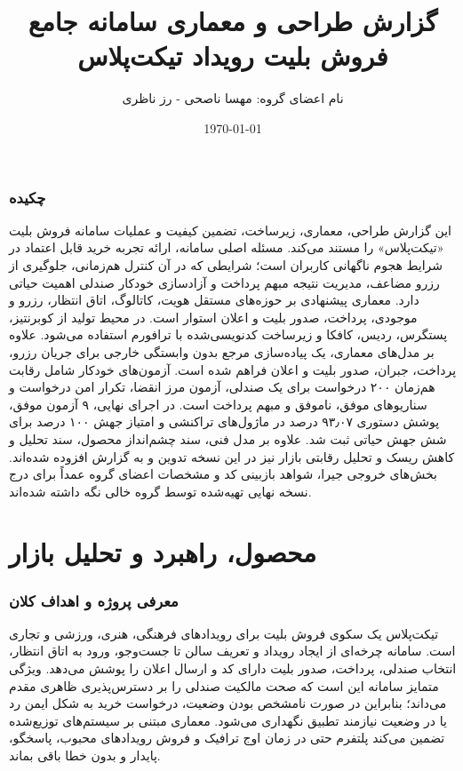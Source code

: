 \documentclass[12pt,a4paper]{article}
\title{گزارش طراحی و معماری سامانه جامع فروش بلیت رویداد تیکت‌پلاس}
\author{نام اعضای گروه: مهسا ناصحی - رز ناظری}
\date{\today}
\newcommand{\term}[1]{\lr{#1}}
\begin{document}
\maketitle
\tableofcontents
\newpage

\section*{چکیده}

این گزارش طراحی، معماری، زیرساخت، تضمین کیفیت و عملیات سامانه فروش بلیت
«تیکت‌پلاس» را مستند می‌کند. مسئله اصلی سامانه، ارائه تجربه خرید قابل اعتماد
در شرایط هجوم ناگهانی کاربران است؛ شرایطی که در آن کنترل هم‌زمانی، جلوگیری از
رزرو مضاعف، مدیریت نتیجه مبهم پرداخت و آزادسازی خودکار صندلی اهمیت حیاتی دارد.
معماری پیشنهادی بر حوزه‌های مستقل هویت، کاتالوگ، اتاق انتظار، رزرو و موجودی،
پرداخت، صدور بلیت و اعلان استوار است. در محیط تولید از کوبرنتیز، پستگرس، ردیس،
کافکا و زیرساخت کدنویسی‌شده با ترافورم استفاده می‌شود.
علاوه بر مدل‌های معماری، یک پیاده‌سازی مرجع بدون وابستگی خارجی برای جریان
رزرو، پرداخت، جبران، صدور بلیت و اعلان فراهم شده است. آزمون‌های خودکار شامل
رقابت هم‌زمان ۲۰۰ درخواست برای یک صندلی، آزمون مرز انقضا، تکرار امن درخواست و
سناریوهای موفق، ناموفق و مبهم پرداخت است. در اجرای نهایی، ۹ آزمون موفق، پوشش
دستوری ۹۳٫۰۷ درصد در ماژول‌های تراکنشی و امتیاز جهش ۱۰۰ درصد برای شش جهش
حیاتی ثبت شد. علاوه بر مدل فنی، سند چشم‌انداز محصول، سند تحلیل و کاهش ریسک و
تحلیل رقابتی بازار نیز در این نسخه تدوین و به گزارش افزوده شده‌اند. بخش‌های
خروجی جیرا، شواهد بازبینی کد و مشخصات اعضای گروه عمداً برای درج نسخه نهایی
تهیه‌شده توسط گروه خالی نگه داشته شده‌اند.

\part{محصول، راهبرد و تحلیل بازار}

\section{معرفی پروژه و اهداف کلان}

تیکت‌پلاس یک سکوی فروش بلیت برای رویدادهای فرهنگی، هنری، ورزشی و تجاری است.
سامانه چرخه‌ای از ایجاد رویداد و تعریف سالن تا جست‌وجو، ورود به اتاق انتظار،
انتخاب صندلی، پرداخت، صدور بلیت دارای کد \term{QR} و ارسال اعلان را پوشش
می‌دهد. ویژگی متمایز سامانه این است که صحت مالکیت صندلی را بر دسترس‌پذیری
ظاهری مقدم می‌داند؛ بنابراین در صورت نامشخص بودن وضعیت، درخواست خرید به شکل
ایمن رد یا در وضعیت نیازمند تطبیق نگهداری می‌شود. معماری مبتنی بر سیستم‌های
توزیع‌شده تضمین می‌کند پلتفرم حتی در زمان اوج ترافیک و فروش رویدادهای محبوب،
پاسخگو، پایدار و بدون خطا باقی بماند.
\end{document}
